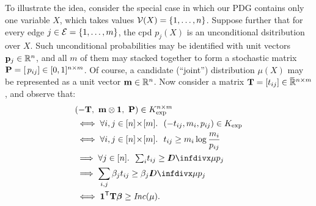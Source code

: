 \documentclass[twoside]{article}
\begin{document}
\subsection{}\label{sec:illust}

To illustrate the idea, consider the special case in which our PDG contains only one variable $X$, which takes values $\mathcal V(X) = \{1, \ldots, n\}$. 
Suppose further that for every edge $j \in \mathcal E = \{1, \ldots, m\}$, the cpd $p_j(X)$ is an unconditional dsitribution over $X$. 
Such unconditional probabilities may be identified with unit vectors $\mathbf{p}_j \in \mathbb R^n$, and all $m$ of them may stacked together to form a stochastic matrix $\mathbf{P} = [\,p_{ij}] \in [0,1]^{n \times m}$.
Of course, a candidate (``joint'') distribution $\mu(X)$
may be represented as a unit vector $\mathbf{m} \in \mathbb R^n$. 
%
Now consider a matrix $\mathbf{T} = [t_{ij}] \in \mskip1mu\overline{\mskip-1mu\mathbb R\!}\,^{n \times m}$,
and observe that:
\begin{align*}
    &(- \mat T,~ \mat m \otimes \mat 1,~ \mat P) \in K_{\exp}^{n \times m} \\
    &\iff \forall  i,j \in [n]\!\times\![m].~~ 
        (- t_{ij}, m_{i}, p_{ij}) \in K_{\exp} \\
    &\iff \forall  i,j \in [n]\!\times\![m].~~ 
            t_{ij} \ge m_i \log \frac{m_i}{p_{ij}} \\
    &\implies \forall j \in [n].~~  {\textstyle\sum_i} t_{ij}  \ge \kldiv{\mu}{p_j} \\
    &\implies \sum_{i,j} \beta_j t_{ij}  \ge \beta_j \kldiv{\mu}{p_j} \\
    &\iff \mat 1^{\sf T} \mat T \bbeta \ge \Inc(\mu)
    .
\end{align*}
\end{document}
